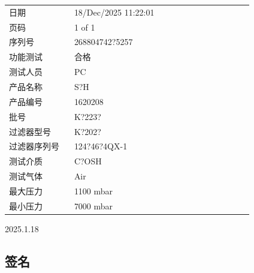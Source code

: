 \documentclass[UTF8,10pt,a4paper,fontset=fandol]{ctexart}
\newcommand{\fieldvalue}[1]{#1}
\newcommand{\handwritten}[1]{#1}
\begin{document}
\begin{tabular}{@{}p{0.24\linewidth}p{0.66\linewidth}@{}}
日期 &
\fieldvalue{18/Dec/2025 11:22:01}
\\
页码 &
\fieldvalue{1 of 1}
\\
序列号 &
\fieldvalue{268804742?5257}
\\
功能测试 &
\fieldvalue{合格}
\\
测试人员 &
\fieldvalue{PC}
\\
产品名称 &
\fieldvalue{S?H}
\\
产品编号 &
\fieldvalue{1620208}
\\
批号 &
\fieldvalue{K?223?}
\\
过滤器型号 &
\fieldvalue{K?202?}
\\
过滤器序列号 &
\fieldvalue{124?46?4QX-1}
\\
测试介质 &
\fieldvalue{C?OSH}
\\
测试气体 &
\fieldvalue{Air}
\\
最大压力 &
\fieldvalue{1100 mbar}
\\
最小压力 &
\fieldvalue{7000 mbar}
\end{tabular}

\vspace{1em}

\handwritten{2025.1.18}

\subsection{签名}
\end{document}

